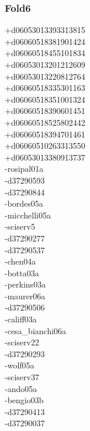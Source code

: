 \begin{multicols}{3}
\subsubsection*{Fold6}
+d06053013393313815\\
+d06060518381901424\\
+d06060518455101834\\
+d06053013201212609\\
+d06053013220812764\\
+d06060518335301163\\
+d06060518351001324\\
+d06060518390601451\\
+d06060518525802442\\
+d06060518394701461\\
+d06060510263313550\\
+d06053013380913737\\
-rosipal01a\\
-d37290593\\
-d37290844\\
-bordes05a\\
-micchelli05a\\
-sciserv5\\
-d37290277\\
-d37290537\\
-chen04a\\
-botta03a\\
-perkins03a\\
-maurer06a\\
-d37290506\\
-califf03a\\
-cesa\_bianchi06a\\
-sciserv22\\
-d37290293\\
-wolf05a\\
-sciserv37\\
-ando05a\\
-bengio03b\\
-d37290413\\
-d37290037\\

\end{multicols}
